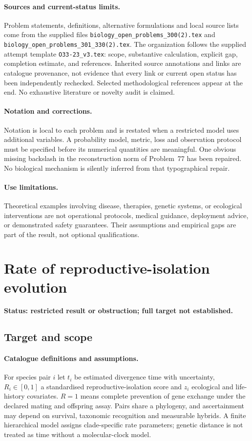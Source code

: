 \documentclass[11pt]{article}
\begin{document}
\paragraph{Sources and current-status limits.}
Problem statements, definitions, alternative formulations and local source lists
come from the supplied files
\texttt{biology\_open\_problems\_300(2).tex} and
\texttt{biology\_open\_problems\_301\_330(2).tex}.
The organization follows the supplied attempt template
\texttt{O33-23\_v3.tex}: scope, substantive calculation, explicit gap,
completion estimate, and references. Inherited source annotations and links are
catalogue provenance, not evidence that every link or current open status has
been independently rechecked. Selected methodological references appear at the
end. No exhaustive literature or novelty audit is claimed.

\paragraph{Notation and corrections.}
Notation is local to each problem and is restated when a restricted model uses
additional variables. A probability model, metric, loss and observation protocol
must be specified before its numerical quantities are meaningful. One obvious
missing backslash in the reconstruction norm of Problem~77 has been repaired.
No biological mechanism is silently inferred from that typographical repair.

\paragraph{Use limitations.}
Theoretical examples involving disease, therapies, genetic systems, or ecological
interventions are not operational protocols, medical guidance, deployment advice,
or demonstrated safety guarantees. Their assumptions and empirical gaps are part
of the result, not optional qualifications.


\section*{Rate of reproductive-isolation evolution}
\label{prob:146}
\noindent\textbf{Status: restricted result or obstruction; full target not established.}
\subsection{Target and scope}
\paragraph{Catalogue definitions and assumptions.}
For species pair $i$ let $t_i$ be estimated divergence time with uncertainty, $R_i\in[0,1]$ a standardised reproductive-isolation score and $z_i$ ecological and life-history covariates. $R=1$ means complete prevention of gene exchange under the declared mating and offspring assay. Pairs share a phylogeny, and ascertainment may depend on survival, taxonomic recognition and measurable hybrids. A finite hierarchical model assigns clade-specific rate parameters; genetic distance is not treated as time without a molecular-clock model.
\end{document}
